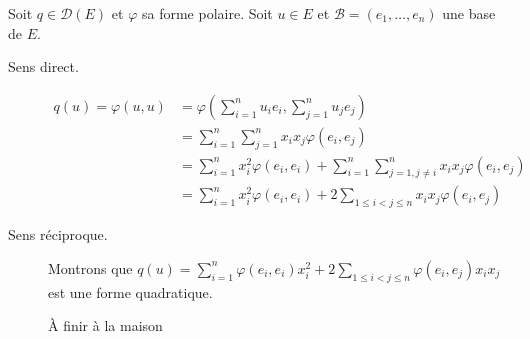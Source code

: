 \documentclass[a4paper, 12pt]{article}
\begin{document}
\begin{demonstration}
    Soit $q \in \mathcal{D}(E)$ et $\varphi$ sa forme polaire.
    Soit $u \in E$ et $\mathcal{B} = (e_1, \dots, e_n)$ une base de $E$.
    
    \begin{description}
        \item[Sens direct.] 
        \begin{align*}
            q(u) = \varphi(u, u) &= \varphi\left( \sum\limits_{i=1}^n u_i e_i, \sum\limits_{j=1}^n u_j e_j \right) \\
            &= \sum_{i=1}^n \sum_{j=1}^n x_i x_j \varphi(e_i, e_j) \\
            &= \sum_{i=1}^n x_i^2 \varphi(e_i, e_i) + \sum_{i=1}^n \sum_{j=1, j \neq i}^n x_i x_j \varphi(e_i, e_j) \\
            &= \sum_{i=1}^n x_i^2 \varphi(e_i, e_i) + 2 \sum_{1 \leq i < j \leq n} x_i x_j \varphi(e_i, e_j)
        \end{align*}

        \item[Sens réciproque.]
        Montrons que $q(u) = \sum_{i=1}^n \varphi(e_i, e_i) x_i^2 + 2 \sum_{1 \leq i < j \leq n} \varphi(e_i, e_j) x_i x_j$ est une forme quadratique.

        \begin{hotwarn}
            À finir à la maison
        \end{hotwarn}
    \end{description}
\end{demonstration}
\end{document}
